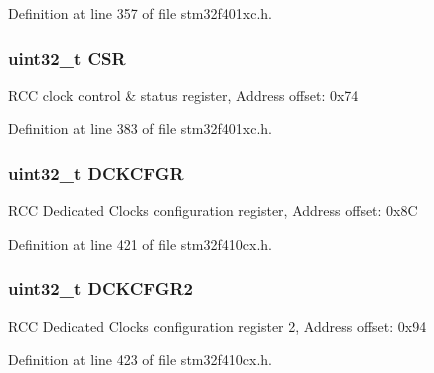Definition at line 357 of file stm32f401xc.\+h.

\subsubsection[{\texorpdfstring{C\+SR}{CSR}}]{ uint32\+\_\+t C\+SR}\hypertarget{struct_r_c_c___type_def_a876dd0a8546697065f406b7543e27af2}{}\label{struct_r_c_c___type_def_a876dd0a8546697065f406b7543e27af2}
R\+CC clock control \& status register, Address offset\+: 0x74 

Definition at line 383 of file stm32f401xc.\+h.

\subsubsection[{\texorpdfstring{D\+C\+K\+C\+F\+GR}{DCKCFGR}}]{ uint32\+\_\+t D\+C\+K\+C\+F\+GR}\hypertarget{struct_r_c_c___type_def_a0a5d6d20b17d55b2e892a924b6e70296}{}\label{struct_r_c_c___type_def_a0a5d6d20b17d55b2e892a924b6e70296}
R\+CC Dedicated Clocks configuration register, Address offset\+: 0x8C 

Definition at line 421 of file stm32f410cx.\+h.

\subsubsection[{\texorpdfstring{D\+C\+K\+C\+F\+G\+R2}{DCKCFGR2}}]{ uint32\+\_\+t D\+C\+K\+C\+F\+G\+R2}\hypertarget{struct_r_c_c___type_def_af5c08405ec6124981a61e07985ef3bc9}{}\label{struct_r_c_c___type_def_af5c08405ec6124981a61e07985ef3bc9}
R\+CC Dedicated Clocks configuration register 2, Address offset\+: 0x94 

Definition at line 423 of file stm32f410cx.\+h.

